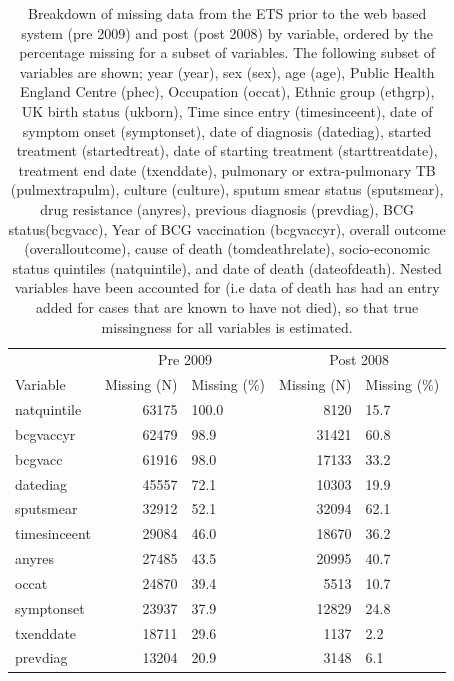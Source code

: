 \documentclass[11pt,twoside]{bristolthesis}
\begin{document}
  \begin{table}[H]
  
  \caption{\label{tab:missing-var-tabs}Breakdown of missing data from the ETS prior to the web based system (pre 2009) and post (post 2008) by variable, ordered by the  percentage missing for a subset of variables. The following subset of variables are shown; year (year), sex (sex), age (age), Public Health England Centre (phec), Occupation (occat), Ethnic group (ethgrp), UK birth status (ukborn), Time since entry (timesinceent), date of symptom onset (symptonset), date of diagnosis (datediag), started treatment (startedtreat), date of starting treatment (starttreatdate), treatment end date (txenddate), pulmonary or extra-pulmonary TB (pulmextrapulm), culture (culture), sputum smear status (sputsmear), drug resistance (anyres), previous diagnosis (prevdiag), BCG status(bcgvacc), Year of BCG vaccination (bcgvaccyr), overall outcome (overalloutcome), cause of death (tomdeathrelate), socio-economic status quintiles (natquintile), and date of death (dateofdeath). Nested variables have been accounted for (i.e data of death has had an entry added for cases that are known to have not died), so that true missingness for all variables is estimated.}
  \centering
  \begin{tabular}{lrlrl}
  \toprule
  \multicolumn{1}{c}{ } & \multicolumn{2}{c}{Pre 2009} & \multicolumn{2}{c}{Post 2008} \\
  \cmidrule(l{3pt}r{3pt}){2-3} \cmidrule(l{3pt}r{3pt}){4-5}
  Variable & Missing (N) &  Missing (\%) & Missing (N) &  Missing (\%)\\
  \midrule
  natquintile & 63175 & 100.0 & 8120 & 15.7\\
  bcgvaccyr & 62479 & 98.9 & 31421 & 60.8\\
  bcgvacc & 61916 & 98.0 & 17133 & 33.2\\
  datediag & 45557 & 72.1 & 10303 & 19.9\\
  sputsmear & 32912 & 52.1 & 32094 & 62.1\\
  \addlinespace
  timesinceent & 29084 & 46.0 & 18670 & 36.2\\
  anyres & 27485 & 43.5 & 20995 & 40.7\\
  occat & 24870 & 39.4 & 5513 & 10.7\\
  symptonset & 23937 & 37.9 & 12829 & 24.8\\
  txenddate & 18711 & 29.6 & 1137 & 2.2\\
  \addlinespace
  prevdiag & 13204 & 20.9 & 3148 & 6.1\\

\end{tabular}
\end{table}
\end{document}
